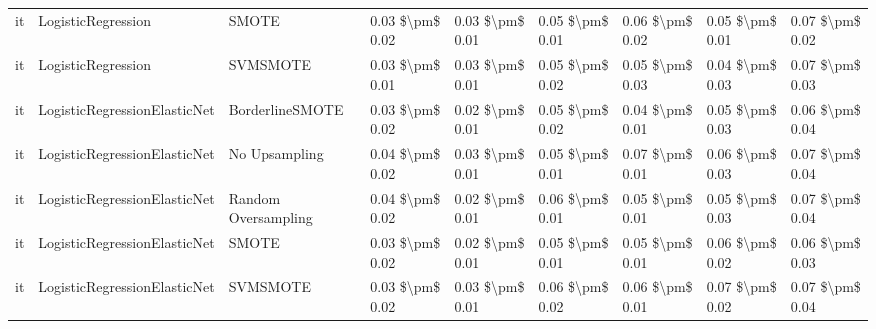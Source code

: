 \begin{tabular}{lllllllll}
      it &              LogisticRegression &                         SMOTE & 0.03 \$\textbackslash pm\$ 0.02 &           0.03 \$\textbackslash pm\$ 0.01 &       0.05 \$\textbackslash pm\$ 0.01 &        0.06 \$\textbackslash pm\$ 0.02 &                         0.05 \$\textbackslash pm\$ 0.01 &     0.07 \$\textbackslash pm\$ 0.02 \\
      it &              LogisticRegression &                      SVMSMOTE & 0.03 \$\textbackslash pm\$ 0.01 &           0.03 \$\textbackslash pm\$ 0.01 &       0.05 \$\textbackslash pm\$ 0.02 &        0.05 \$\textbackslash pm\$ 0.03 &                         0.04 \$\textbackslash pm\$ 0.03 &     0.07 \$\textbackslash pm\$ 0.03 \\
      it &    LogisticRegressionElasticNet &               BorderlineSMOTE & 0.03 \$\textbackslash pm\$ 0.02 &           0.02 \$\textbackslash pm\$ 0.01 &       0.05 \$\textbackslash pm\$ 0.02 &        0.04 \$\textbackslash pm\$ 0.01 &                         0.05 \$\textbackslash pm\$ 0.03 &     0.06 \$\textbackslash pm\$ 0.04 \\
      it &    LogisticRegressionElasticNet &                 No Upsampling & 0.04 \$\textbackslash pm\$ 0.02 &           0.03 \$\textbackslash pm\$ 0.01 &       0.05 \$\textbackslash pm\$ 0.01 &        0.07 \$\textbackslash pm\$ 0.01 &                         0.06 \$\textbackslash pm\$ 0.03 &     0.07 \$\textbackslash pm\$ 0.04 \\
      it &    LogisticRegressionElasticNet &           Random Oversampling & 0.04 \$\textbackslash pm\$ 0.02 &           0.02 \$\textbackslash pm\$ 0.01 &       0.06 \$\textbackslash pm\$ 0.01 &        0.05 \$\textbackslash pm\$ 0.01 &                         0.05 \$\textbackslash pm\$ 0.03 &     0.07 \$\textbackslash pm\$ 0.04 \\
      it &    LogisticRegressionElasticNet &                         SMOTE & 0.03 \$\textbackslash pm\$ 0.02 &           0.02 \$\textbackslash pm\$ 0.01 &       0.05 \$\textbackslash pm\$ 0.01 &        0.05 \$\textbackslash pm\$ 0.01 &                         0.06 \$\textbackslash pm\$ 0.02 &     0.06 \$\textbackslash pm\$ 0.03 \\
      it &    LogisticRegressionElasticNet &                      SVMSMOTE & 0.03 \$\textbackslash pm\$ 0.02 &           0.03 \$\textbackslash pm\$ 0.01 &       0.06 \$\textbackslash pm\$ 0.02 &        0.06 \$\textbackslash pm\$ 0.01 &                         0.07 \$\textbackslash pm\$ 0.02 &     0.07 \$\textbackslash pm\$ 0.04 \\

\end{tabular}
